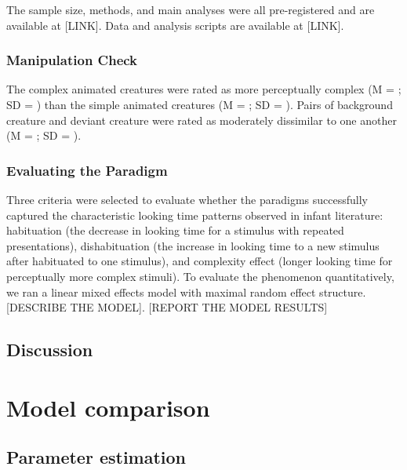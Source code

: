 \documentclass[10pt, letterpaper]{article}
\begin{document}
The sample size, methods, and main analyses were all pre-registered and
are available at {[}LINK{]}. Data and analysis scripts are available at
{[}LINK{]}.

\hypertarget{manipulation-check}{%
\subsubsection{Manipulation Check}\label{manipulation-check}}

The complex animated creatures were rated as more perceptually complex
(M = ; SD = ) than the simple animated creatures (M = ; SD = ). Pairs of
background creature and deviant creature were rated as moderately
dissimilar to one another (M = ; SD = ).

\hypertarget{evaluating-the-paradigm}{%
\subsubsection{Evaluating the Paradigm}\label{evaluating-the-paradigm}}

Three criteria were selected to evaluate whether the paradigms
successfully captured the characteristic looking time patterns observed
in infant literature: habituation (the decrease in looking time for a
stimulus with repeated presentations), dishabituation (the increase in
looking time to a new stimulus after habituated to one stimulus), and
complexity effect (longer looking time for perceptually more complex
stimuli). To evaluate the phenomenon quantitatively, we ran a linear
mixed effects model with maximal random effect structure. {[}DESCRIBE
THE MODEL{]}. {[}REPORT THE MODEL RESULTS{]}

\hypertarget{discussion}{%
\subsection{Discussion}\label{discussion}}

\hypertarget{model-comparison}{%
\section{Model comparison}\label{model-comparison}}

\hypertarget{parameter-estimation}{%
\subsection{Parameter estimation}\label{parameter-estimation}}
\end{document}
